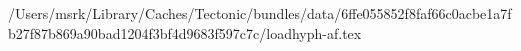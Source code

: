 /Users/msrk/Library/Caches/Tectonic/bundles/data/6ffe055852f8faf66c0acbe1a7fb27f87b869a90bad1204f3bf4d9683f597c7c/loadhyph-af.tex